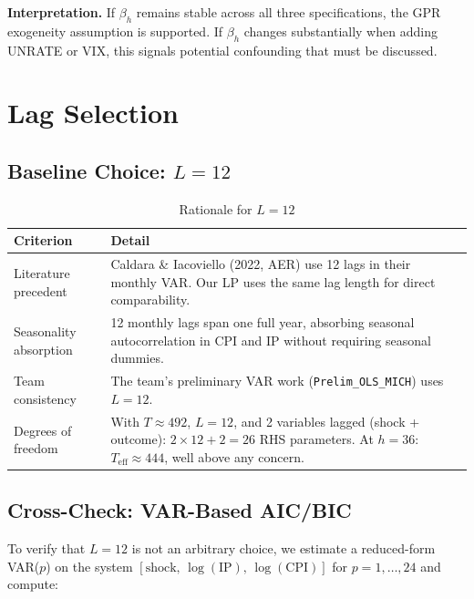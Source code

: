 \documentclass[11pt,a4paper]{article}
\begin{document}
\noindent\textbf{Interpretation.} If $\beta_h$ remains stable across all three specifications, the GPR exogeneity assumption is supported. If $\beta_h$ changes substantially when adding UNRATE or VIX, this signals potential confounding that must be discussed.

\section{Lag Selection}

\subsection{Baseline Choice: $L = 12$}

\begin{table}[H]
\centering
\caption{Rationale for $L = 12$}
\label{tab:lag_rationale}
\begin{tabularx}{\textwidth}{@{}l X@{}}
\toprule
\textbf{Criterion} & \textbf{Detail} \\
\midrule
Literature precedent & Caldara \& Iacoviello (2022, AER) use 12 lags in their monthly VAR. Our LP uses the same lag length for direct comparability. \\
Seasonality absorption & 12 monthly lags span one full year, absorbing seasonal autocorrelation in CPI and IP without requiring seasonal dummies. \\
Team consistency & The team's preliminary VAR work (\texttt{Prelim\_OLS\_MICH}) uses $L = 12$. \\
Degrees of freedom & With $T \approx 492$, $L = 12$, and 2 variables lagged (shock + outcome): $2 \times 12 + 2 = 26$ RHS parameters. At $h = 36$: $T_{\text{eff}} \approx 444$, well above any concern. \\
\bottomrule
\end{tabularx}
\end{table}

\subsection{Cross-Check: VAR-Based AIC/BIC}

To verify that $L = 12$ is not an arbitrary choice, we estimate a reduced-form VAR($p$) on the system $[\text{shock},\, \log(\text{IP}),\, \log(\text{CPI})]$ for $p = 1, \ldots, 24$ and compute:
\end{document}
